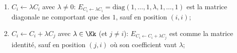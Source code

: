 \documentclass[class=report,crop=false]{standalone}
\begin{document}
\begin{enumerate}
  \item $C_i \leftarrow \lambda C_i$ avec $\lambda \neq 0$:
  $E_{C_i \leftarrow \lambda C_i} = \text{diag}(1,\ldots,1,\lambda,1,\ldots,1)$ est la matrice diagonale
  ne comportant que des $1$, sauf en position $(i,i)$;



  \item $C_i \leftarrow C_i+\lambda C_j$ avec $\lambda \in \Kk$ (et $j\neq i$):
  $E_{C_i \leftarrow C_i+\lambda C_j}$ est comme la matrice identité,
  sauf en position $(j,i)$ où son coefficient vaut $\lambda$;




\end{enumerate}
\end{document}
